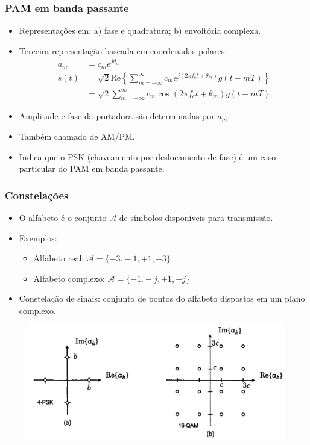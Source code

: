 \begin{frame}
	\frametitle{PAM em banda passante}

	\begin{itemize}
	  \item Representações em: a) fase e quadratura; b) envoltória complexa.
	  \item Terceira representação baseada em coordenadas polares:
	  \begin{align*}
	      a_m &= c_m e^{j \theta_m} \\
	      s(t) &= \sqrt{2} \mathrm{Re} \left\{ \sum_{m=-\infty}^{\infty} c_m e^{j(2\pi f_c t + \theta_m)} g(t-mT) \right\} \\
 	      &= \sqrt{2} \sum_{m=-\infty}^{\infty} c_m \cos(2\pi f_c t + \theta_m) g(t-mT)
	  \end{align*}
	  \item Amplitude e fase da portadora são determinadas por $a_m$.
	  \item Também chamado de AM/PM.
	  \item Indica que o PSK (chaveamento por deslocamento de fase) é um caso particular do PAM em banda passante.
	\end{itemize}	
\end{frame}

\begin{frame}
	\frametitle{Constelações}

	\begin{itemize}
	  \item O alfabeto é o conjunto $\mathcal{A}$ de símbolos disponíveis para transmissão.
	  \item Exemplos:
	  \begin{itemize}
		\item Alfabeto real: $\mathcal{A} = \{ -3. -1, +1, +3 \}$
		\item Alfabeto complexo: $\mathcal{A} = \{ -1. -j, +1, +j \}$
	  \end{itemize}
	    \item Constelação de sinais: conjunto de pontos do alfabeto dispostos em um plano complexo.
	\end{itemize}	
	\begin{figure}[t]	
	      \begin{center}
		\includegraphics[width=0.7\columnwidth]{figs/pam_17}
	      \end{center}
	    \end{figure}
\end{frame}

